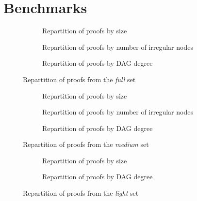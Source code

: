 \section{Benchmarks}
\begin{figure}[hbt]
  \begin{subfigure}{\textwidth}
    \centering
  \caption{Repartition of proofs by size}
  \end{subfigure}
  \begin{subfigure}{\textwidth}
    \centering
  \caption{Repartition of proofs by number of irregular nodes}
  \end{subfigure}
  \begin{subfigure}{\textwidth}
    \centering
  \caption{Repartition of proofs by DAG degree}
  \end{subfigure}
\caption{Repartition of proofs from the \emph{full} set}
\end{figure}
\begin{figure}[hbt]
  \begin{subfigure}{\textwidth}
    \centering
  \caption{Repartition of proofs by size}
  \end{subfigure}
  \begin{subfigure}{\textwidth}
    \centering
  \caption{Repartition of proofs by number of irregular nodes}
  \end{subfigure}
  \begin{subfigure}{\textwidth}
    \centering
  \caption{Repartition of proofs by DAG degree}
  \end{subfigure}
\caption{Repartition of proofs from the \emph{medium} set}
\end{figure}
\begin{figure}[hbt]
  \begin{subfigure}{\textwidth}
    \centering
  \caption{Repartition of proofs by size}
  \end{subfigure}
  \begin{subfigure}{\textwidth}
    \centering
  \caption{Repartition of proofs by DAG degree}
  \end{subfigure}
\caption{Repartition of proofs from the \emph{light} set}
\end{figure}
